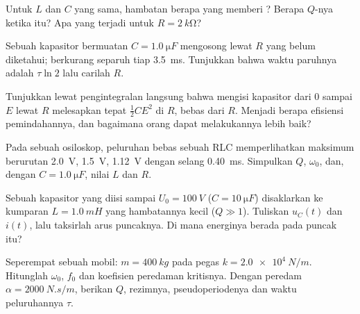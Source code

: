 \begin{exercise}[$\star$]\label{exo:b1:transient-regimes:4}
Untuk $L$ dan $C$ yang sama, hambatan berapa yang memberi ?
Berapa $Q$-nya ketika itu? Apa yang terjadi untuk $R = \qty{2}{k\ohm}$?
\end{exercise}

\begin{exercise}[$\star\star$]\label{exo:b1:transient-regimes:5}
Sebuah kapasitor bermuatan $C = \qty{1.0}{\micro F}$ mengosong lewat $R$
yang belum diketahui;  berkurang separuh tiap \qty{3.5}{ms}.
Tunjukkan bahwa waktu paruhnya adalah $\tau\ln 2$ lalu carilah $R$.
\end{exercise}

\begin{exercise}[$\star\star$]\label{exo:b1:transient-regimes:6}
Tunjukkan lewat pengintegralan langsung bahwa mengisi kapasitor dari $0$
sampai $E$ lewat $R$ melesapkan tepat $\tfrac12 CE^2$ di $R$, bebas dari
$R$. Menjadi berapa efisiensi pemindahannya, dan bagaimana orang dapat
melakukannya lebih baik?
\end{exercise}

\begin{exercise}[$\star\star$]\label{exo:b1:transient-regimes:7}
Pada sebuah osiloskop, peluruhan bebas sebuah RLC memperlihatkan
maksimum berurutan \qty{2.0}{V}, \qty{1.5}{V}, \qty{1.12}{V} dengan
selang \qty{0.40}{ms}. Simpulkan $Q$, $\omega_0$, dan, dengan
$C = \qty{1.0}{\micro F}$, nilai $L$ dan $R$.
\end{exercise}

\begin{exercise}[$\star\star$]\label{exo:b1:transient-regimes:8}
Sebuah kapasitor yang diisi sampai $U_0 = \qty{100}{V}$ ($C = \qty{10}{\micro F}$)
disaklarkan ke kumparan $L = \qty{1.0}{mH}$ yang hambatannya kecil ($Q \gg 1$).
Tuliskan $u_C(t)$ dan $i(t)$, lalu taksirlah arus puncaknya. Di mana
energinya berada pada puncak itu?
\end{exercise}

\begin{exercise}[$\star\star$]\label{exo:b1:transient-regimes:9}
Seperempat sebuah mobil: $m = \qty{400}{kg}$ pada pegas $k = \qty{2.0e4}{N/m}$.
Hitunglah $\omega_0$, $f_0$ dan koefisien peredaman kritisnya. Dengan
peredam $\alpha = \qty{2000}{N.s/m}$, berikan $Q$, rezimnya,
pseudoperiodenya dan waktu peluruhannya $\tau$.
\end{exercise}

